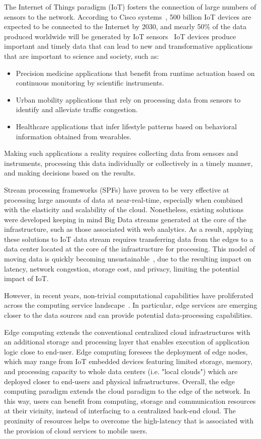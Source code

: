 The Internet of Things paradigm (IoT) fosters the connection of large numbers of sensors to the network. According to Cisco systems~\cite{ciscoGlance}, 500 billion IoT devices are expected to be connected to the Internet by 2030, and mearly 50\% of the data produced worldwide will be generated by IoT sensors~\cite{McAuley}
%
IoT devices produce important and timely data that can lead to new and transformative applications that are important to science and society, such as:
%
\begin{itemize} 
  \item Precision medicine applications that benefit from runtime actuation based on continuous monitoring by scientific instruments.
  \item Urban mobility applications that rely on processing data from sensors to identify and alleviate traffic congestion. 
  \item Healthcare applications that infer lifestyle patterns based on behavioral information obtained from wearables. 
\end{itemize} 

Making such applications a reality requires collecting data from sensors and instruments, processing this data individually or collectively in a timely manner, and making decisions based on the results. 

Stream processing frameworks (SPFs) have proven to be very effective at processing large amounts of data at near-real-time, especially when combined with the elasticity and scalability of the cloud. Nonetheless, existing solutions were developed keeping in mind Big Data streams generated at the core of the infrastructure, such as those associated with web analytics. As a result, applying these solutions to IoT data stream requires transferring data from the edges to a data center located at the core of the infrastructure for processing. This model of moving data is quickly becoming unsustainable~\cite{intro}, due to the resulting impact on latency, network congestion, storage cost, and privacy, limiting the potential impact of IoT.

However, in recent years, non-trivial computational capabilities have proliferated across the computing service landscape~\cite{continuum}. In particular, edge services are emerging closer to the data sources and can provide potential data-processing capabilities\cite{dastjerdi2016fog,bonomi2014fog}. 

Edge computing extends the conventional centralized cloud infrastructures with an additional storage and processing layer that enables execution of application logic close to end-user. Edge computing foresees the deployment of edge nodes, which may range from IoT embedded devices featuring limited storage, memory, and processing capacity to whole data centers (i.e. "local clouds") which are deployed closer to end-users and physical infrastructures. Overall, the edge computing paradigm extends the cloud paradigm to the edge of the network. In this way, users can benefit from computing, storage and communication resources at their vicinity, instead of interfacing to a centralized back-end cloud. The proximity of resources helps to overcome the high-latency that is associated with the provision of cloud services to mobile users.

